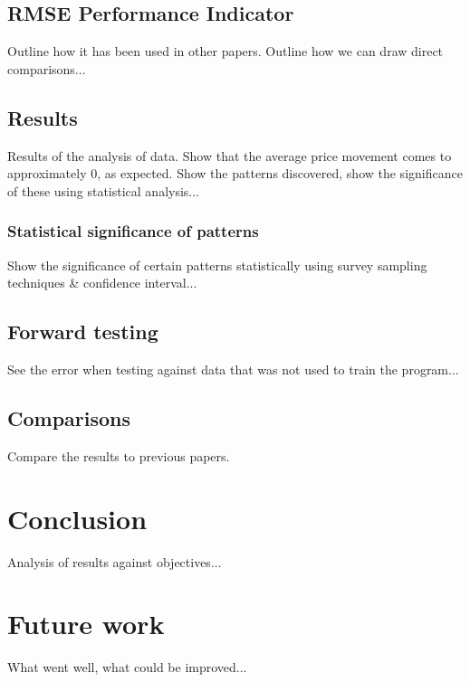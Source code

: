 \documentclass{article}
\begin{document}
\subsection{RMSE Performance Indicator}

Outline how it has been used in other papers. Outline how we can draw direct comparisons...

\subsection{Results}

Results of the analysis of data. Show that the average price movement comes to approximately 0, as expected. Show the patterns discovered, show the significance of these using statistical analysis...

\subsubsection{Statistical significance of patterns}

Show the significance of certain patterns statistically using survey sampling techniques \& confidence interval...

\subsection{Forward testing}

See the error when testing against data that was not used to train the program...

\subsection{Comparisons}

Compare the results to previous papers.

\section{Conclusion}

Analysis of results against objectives...

\section{Future work}

What went well, what could be improved...



\end{document}
